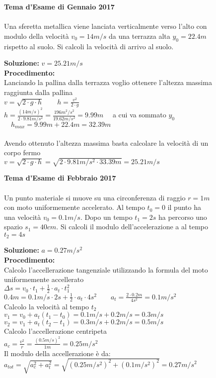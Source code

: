 \begin{figure}[h!]
\textbf{Tema d'Esame di Gennaio 2017}\\ \\
Una sferetta metallica viene lanciata verticalmente verso l’alto con modulo della velocità
$v_0= 14 m/s$  da una terrazza alta $y_0 = 22.4m$ rispetto al suolo. Si calcoli la velocità di arrivo al suolo. \\
\begin{boxed}
    \null\hfill \textbf{Soluzione:} $v = 25.21m/s$\\
\textbf{Procedimento:}  \\  
Lanciando la pallina dalla terrazza voglio ottenere l'altezza massima raggiunta dalla pallina\\
$v=\sqrt{2\cdot g \cdot h} \qquad h=\frac{v^2}{2\cdot g}$\\
$h=\frac{(14m/s)^2}{2\cdot 9.81 m/s^2} = \frac{196m^2/s^2}{19.62 m/s^2}=9.99m \quad$ a cui va  sommato $y_0$ \\
$\quad h_{max}= 9.99m + 22.4m = 32.39m$\\ \\
Avendo ottenuto l'altezza massima basta calcolare la velocità di un corpo fermo\\
$v=\sqrt{2\cdot g\cdot h} = \sqrt{2\cdot 9.81m/s^2\cdot 33.39m}=25.21m/s$
\end{boxed}
\end{figure}



\begin{figure}[h!]
\textbf{Tema d'Esame di Febbraio 2017}\\ \\
 Un punto materiale si muove su una circonferenza di raggio $r = 1 m$ con moto
uniformemente accelerato. Al tempo $t_0 = 0$ il punto ha una velocità $v_0 = 0.1 m/s$. Dopo un tempo $t_1 = 2 s$ ha percorso uno spazio $s_1 = 40 cm$. Si calcoli il modulo dell’accelerazione a al tempo $t_2 = 4 s$

\begin{boxed}
    \null\hfill \textbf{Soluzione:} $a = 0.27m/s^2$\\
    \textbf{Procedimento:}  \\ 
Calcolo l'accellerazione tangenziale utilizzando la formula del moto uniformemente accellerato\\
$\Delta s=v_0\cdot t_1+\frac{1}{2}\cdot a_t\cdot t_1^2$\\
$0.4m=0.1m/s\cdot 2s +\frac{1}{2}\cdot a_t \cdot 4s^2 \qquad a_t=\frac{2\cdot 0.2m}{4s^2}=0.1m/s^2$\\
Calcolo la velocità al tempo $t_2$\\
$v_1=v_0+a_t(t_1-t_0)=0.1m/s+0.2m/s=0.3m/s $\\
$v_2=v_1+a_t(t_2-t_1)=0.3m/s+0.2m/s=0.5m/s $\\
Calcolo l'accellerazione centripeta\\
$a_c=\frac{v^2}{r}=\frac{(0.5m/s)^2}{1m}=0.25m/s^2$\\
Il modulo della accellerazione è da:\\
$a_{tot}=\sqrt{a_c^2+a_t^2}=\sqrt{(0.25m/s^2)^2+(0.1m/s^2)^2}=0.27m/s^2$
\end{boxed}
\end{figure}


